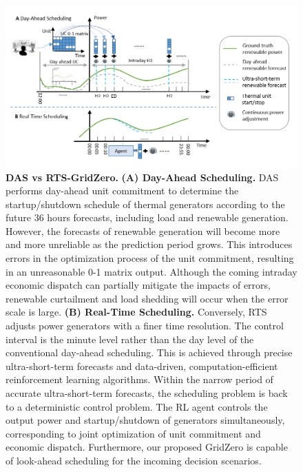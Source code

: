 \begin{figure}[h]
  \centering
  \includegraphics[width=0.9\linewidth]{fig/das_rts.png}
  \caption{\textbf{DAS vs RTS-GridZero.}
  \textbf{(A) Day-Ahead Scheduling.} DAS performs day-ahead unit commitment to determine the startup/shutdown schedule of thermal generators according to the future 36 hours forecasts, including load and renewable generation. However, the forecasts of renewable generation will become more and more unreliable as the prediction period grows. This introduces errors in the optimization process of the unit commitment, resulting in an unreasonable 0-1 matrix output. Although the coming intraday economic dispatch can partially mitigate the impacts of errors, renewable curtailment and load shedding will occur when the error scale is large.
  \textbf{(B) Real-Time Scheduling.} Conversely, RTS adjusts power generators with a finer time resolution. The control interval is the minute level rather than the day level of the conventional day-ahead scheduling. This is achieved through precise ultra-short-term forecasts and data-driven, computation-efficient reinforcement learning algorithms. Within the narrow period of accurate ultra-short-term forecasts, the scheduling problem is back to a deterministic control problem. The RL agent controls the output power and startup/shutdown of generators simultaneously, corresponding to joint optimization of unit commitment and economic dispatch. Furthermore, our proposed GridZero is capable of look-ahead scheduling for the incoming decision scenarios.
  } 
  \label{fig:das-vs-rts}
\end{figure}

